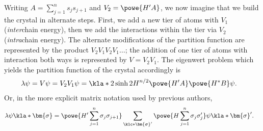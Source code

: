 \documentclass[english, parskip=full]{scrartcl}
\newcommand{\note}[1]{\bgroup\color{black!30!blue}#1\egroup}
\begin{document}
Writing $A=\sum_{j=1}^n s_js_{j+1}$ and $V_2 = \powe{H'A}$, we now imagine that we build the crystal in alternate steps.
First, we add a new tier of atoms with $V_1$ \note{(\emph{inter}chain energy)}, then we add the interactions within the tier via $V_2$ \note{(\emph{intra}chain energy)}.
The alternate modifications of the partition function are represented by the product $V_2V_1V_2V_1\dots$; the addition of one tier of atoms with interaction both ways is represented by $V=V_2V_1$.
The eigenwert problem which yields the partition function of the crystal accordingly is
\begin{align}
\lambda\psi &= V\psi = V_2V_1\psi = \kla*{2\sinh 2H}^{n/2} \powe{H'A} \powe{H^\ast B} \psi.
\end{align}
Or, in the more explicit matrix notation used by previous authors,
\begin{align}
\lambda\psi\kla*{\bm{\sigma}} &= \powe{H' \sum_{j=1}^n \sigma_j \sigma_{j+1}} \sum_{\klc*{\bm{\sigma}'}} \powe{H \sum_{j=1}^n \sigma_j \sigma_j'} \psi\kla*{\bm{\sigma}'}.
\end{align}
\end{document}
